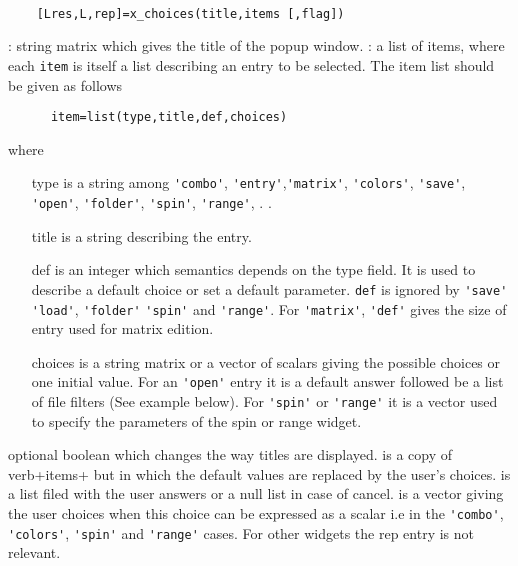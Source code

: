 \begin{mandesc}
  \\ %
\end{mandesc}
\begin{calling_sequence}
  \begin{verbatim}
    [Lres,L,rep]=x_choices(title,items [,flag])   
  \end{verbatim}
\end{calling_sequence}
\begin{parameters}
  \begin{varlist}
    : string matrix which gives the title of the popup window.
    : a list of items, where each \verb!item! is itself a list 
    describing an entry to be selected. The item list should be given as follows 
    \begin{verbatim}
      item=list(type,title,def,choices) 
    \end{verbatim} 
    where 
    \begin{itemize}
      \item[type] is a string among \verb+'combo'+, \verb+'entry'+,\verb+'matrix'+, 
      \verb+'colors'+, \verb+'save'+, \verb+'open'+, \verb+'folder'+,  \verb+'spin'+,  \verb+'range'+, .  . 
    \item[title] is a string describing the entry. 
    \item[def] is an integer which semantics depends on the type field. It is used to describe a default choice or set 
      a default parameter. \verb+def+ is ignored by \verb+'save'+ 
      \verb+'load'+, \verb+'folder'+ \verb+'spin'+ and \verb+'range'+. 
      For \verb+'matrix'+, \verb+'def'+ gives the size of entry used for matrix edition.
    \item[choices] is a string matrix or a vector of scalars giving the possible choices or one initial value. For an 
      \verb+'open'+ entry it is a default answer followed be a list of file filters (See example below). For 
      \verb+'spin'+ or \verb+'range'+ it is a vector used to specify the parameters of the spin or range widget.
    \end{itemize}
     optional boolean which changes the way titles are displayed. 
     is a copy of verb+items+ but in which the default values are replaced by the user's choices. 
     is a list filed with the user answers or a null list in case of cancel.
     is a vector giving the user choices when this choice can be expressed as a scalar 
    i.e in the \verb+'combo'+, \verb+'colors'+, \verb+'spin'+ and \verb+'range'+ cases. For other widgets 
    the rep entry is not relevant.
  \end{varlist}
\end{parameters}
